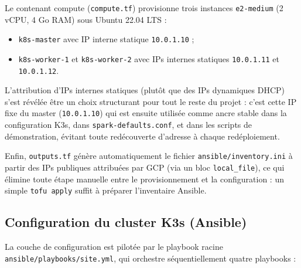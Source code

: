 \documentclass{name}
\begin{document}
Le contenant compute (\texttt{compute.tf}) provisionne trois instances \texttt{e2-medium} (2 vCPU, 4 Go RAM) sous Ubuntu 22.04 LTS :
\begin{itemize}
    \item \texttt{k8s-master} avec IP interne statique \texttt{10.0.1.10} ;
    \item \texttt{k8s-worker-1} et \texttt{k8s-worker-2} avec IPs internes statiques \texttt{10.0.1.11} et \texttt{10.0.1.12}.
\end{itemize}

L'attribution d'IPs internes statiques (plutôt que des IPs dynamiques DHCP) s'est révélée être un choix structurant pour tout le reste du projet : c'est cette IP fixe du master (\texttt{10.0.1.10}) qui est ensuite utilisée comme ancre stable dans la configuration K3s, dans \texttt{spark-defaults.conf}, et dans les scripts de démonstration, évitant toute redécouverte d'adresse à chaque redéploiement.

Enfin, \texttt{outputs.tf} génère automatiquement le fichier \texttt{ansible/inventory.ini} à partir des IPs publiques attribuées par GCP (via un bloc \texttt{local\_file}), ce qui élimine toute étape manuelle entre le provisionnement et la configuration : un simple \texttt{tofu apply} suffit à préparer l'inventaire Ansible.

\subsection{Configuration du cluster K3s (Ansible)}

La couche de configuration est pilotée par le playbook racine \texttt{ansible/playbooks/site.yml}, qui orchestre séquentiellement quatre playbooks :
\end{document}
